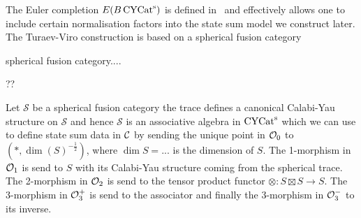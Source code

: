 The Euler completion $E(B\operatorname{\mathrm{CYCat}^s})$ is defined in~\cite{3DOrb} and effectively allows one to include certain normalisation factors into the state sum model we construct later.
The Turaev-Viro construction is based on a spherical fusion category
\begin{definition}
    spherical fusion category....
\end{definition}
\begin{example}
    ??
\end{example}
Let $\mathcal{S}$ be a spherical fusion category the trace defines a canonical Calabi-Yau structure on $\mathcal{S}$ and hence $\mathcal{S}$ is an associative algebra in $\operatorname{\mathrm{CYCat}^s}$ which we can use to define state sum data in $\mathcal{C}$ by sending the unique point in $\mathcal{O}_0$ to $(*,\dim (S)^{-\tfrac{1}{2}})$, where $\dim S = ...$ is the dimension of $S$. The 1-morphism in $\mathcal{O}_1$ is send to $S$ with its Calabi-Yau structure coming from the spherical trace. The 2-morphism in $\mathcal{O}_2$ is send to the tensor product functor $\otimes \colon S\boxtimes S \to S$. The 3-morphism in $\mathcal{O}_3^+$ is send to the associator and finally the 3-morphism in $\mathcal{O}_3^-$ to its inverse.